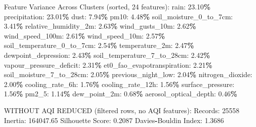 \documentclass[
  letterpaper,
  DIV=11,
  numbers=noendperiod]{scrartcl}
\newenvironment{Shaded}{\begin{snugshade}}{\end{snugshade}}
\newcommand{\BuiltInTok}[1]{#1}
\newcommand{\DecValTok}[1]{\textcolor[rgb]{0.00,0.00,0.81}{#1}}
\newcommand{\FloatTok}[1]{\textcolor[rgb]{0.00,0.00,0.81}{#1}}
\newcommand{\NormalTok}[1]{#1}
\newcommand{\OperatorTok}[1]{\textcolor[rgb]{0.81,0.36,0.00}{\textbf{#1}}}
\begin{document}
\begin{Shaded}
\begin{Highlighting}[]
\NormalTok{  Feature Variance Across Clusters (}\BuiltInTok{sorted}\NormalTok{, }\DecValTok{24}\NormalTok{ features):}
\NormalTok{    rain: }\FloatTok{23.10}\OperatorTok{\%}
\NormalTok{    precipitation: }\FloatTok{23.01}\OperatorTok{\%}
\NormalTok{    dust: }\FloatTok{7.94}\OperatorTok{\%}
\NormalTok{    pm10: }\FloatTok{4.48}\OperatorTok{\%}
\NormalTok{    soil\_moisture\_0\_to\_7cm: }\FloatTok{3.41}\OperatorTok{\%}
\NormalTok{    relative\_humidity\_2m: }\FloatTok{2.63}\OperatorTok{\%}
\NormalTok{    wind\_gusts\_10m: }\FloatTok{2.62}\OperatorTok{\%}
\NormalTok{    wind\_speed\_100m: }\FloatTok{2.61}\OperatorTok{\%}
\NormalTok{    wind\_speed\_10m: }\FloatTok{2.57}\OperatorTok{\%}
\NormalTok{    soil\_temperature\_0\_to\_7cm: }\FloatTok{2.54}\OperatorTok{\%}
\NormalTok{    temperature\_2m: }\FloatTok{2.47}\OperatorTok{\%}
\NormalTok{    dewpoint\_depression: }\FloatTok{2.43}\OperatorTok{\%}
\NormalTok{    soil\_temperature\_7\_to\_28cm: }\FloatTok{2.42}\OperatorTok{\%}
\NormalTok{    vapour\_pressure\_deficit: }\FloatTok{2.31}\OperatorTok{\%}
\NormalTok{    et0\_fao\_evapotranspiration: }\FloatTok{2.21}\OperatorTok{\%}
\NormalTok{    soil\_moisture\_7\_to\_28cm: }\FloatTok{2.05}\OperatorTok{\%}
\NormalTok{    previous\_night\_low: }\FloatTok{2.04}\OperatorTok{\%}
\NormalTok{    nitrogen\_dioxide: }\FloatTok{2.00}\OperatorTok{\%}
\NormalTok{    cooling\_rate\_6h: }\FloatTok{1.76}\OperatorTok{\%}
\NormalTok{    cooling\_rate\_12h: }\FloatTok{1.56}\OperatorTok{\%}
\NormalTok{    surface\_pressure: }\FloatTok{1.56}\OperatorTok{\%}
\NormalTok{    pm2\_5: }\FloatTok{1.14}\OperatorTok{\%}
\NormalTok{    dew\_point\_2m: }\FloatTok{0.68}\OperatorTok{\%}
\NormalTok{    aerosol\_optical\_depth: }\FloatTok{0.46}\OperatorTok{\%}

\NormalTok{WITHOUT AQI REDUCED (filtered rows, no AQI features):}
\NormalTok{  Records: }\DecValTok{25558}
\NormalTok{  Inertia: }\FloatTok{164047.65}
\NormalTok{  Silhouette Score: }\FloatTok{0.2087}
\NormalTok{  Davies}\OperatorTok{{-}}\NormalTok{Bouldin Index: }\FloatTok{1.3686}


\end{Highlighting}
\end{Shaded}
\end{document}
